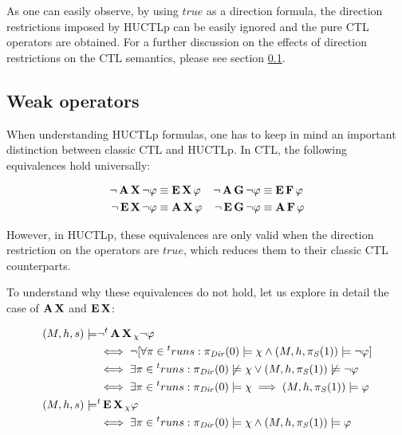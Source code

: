 As one can easily observe, by using $true$ as a direction formula, the direction restrictions imposed by \ac{HUCTLp} can be easily ignored and the pure \ac{CTL} operators are obtained. For a further discussion on the effects of direction restrictions on the \ac{CTL} semantics, please see section \ref{sec:weak}.

\subsection{Weak operators}
\label{sec:weak}

When understanding \ac{HUCTLp} formulas, one has to keep in mind an important distinction between classic \ac{CTL} and \ac{HUCTLp}. In \ac{CTL}, the following equivalences hold universally:

\begin{align*}
	\neg \operatorname{\mathbf{A}}\operatorname{\mathbf{X}} \neg \varphi 			& \equiv \operatorname{\mathbf{E}}\operatorname{\mathbf{X}} \varphi &
	\neg \operatorname{\mathbf{A}}\operatorname{\mathbf{G}} \neg \varphi 			& \equiv \operatorname{\mathbf{E}}\operatorname{\mathbf{F}} \varphi \\
	\neg \operatorname{\mathbf{E}}\operatorname{\mathbf{X}} \neg \varphi 			& \equiv \operatorname{\mathbf{A}}\operatorname{\mathbf{X}} \varphi &
	\neg \operatorname{\mathbf{E}}\operatorname{\mathbf{G}} \neg \varphi 			& \equiv \operatorname{\mathbf{A}}\operatorname{\mathbf{F}} \varphi \\
\end{align*}

However, in \ac{HUCTLp}, these equivalences are only valid when the direction restriction on the operators are $true$, which reduces them to their classic \ac{CTL} counterparts.

To understand why these equivalences do not hold, let us explore in detail the case of $\operatorname{\mathbf{A}}\operatorname{\mathbf{X}}$ and $\operatorname{\mathbf{E}}\operatorname{\mathbf{X}}$:

\begin{align*}
		(M, h, s) \models & \neg {}^{t}\operatorname{\mathbf{A}}\operatorname{\mathbf{X}}{}_{\chi} \neg \varphi	\\	
			& \iff  \neg [ \forall \pi \in {}^{t}runs  : \pi_{\mathit{Dir}}(0) \models \chi \land (M, h, \pi_{\mathit{S}}(1)) \models \neg \varphi ] \\
			& \iff  \exists \pi \in {}^{t}runs  : \pi_{\mathit{Dir}}(0) \not\models \chi \lor (M, h, \pi_{\mathit{S}}(1)) \not\models \neg \varphi \\ 
			& \iff  \exists \pi \in {}^{t}runs  : \pi_{\mathit{Dir}}(0) \models \chi \implies (M, h, \pi_{\mathit{S}}(1)) \models \varphi \\
		(M, h, s) \models & {}^{t}\operatorname{\mathbf{E}}\operatorname{\mathbf{X}}{}_{\chi} \varphi \\		
			& \iff \exists \pi \in {}^{t}runs  : \pi_{\mathit{Dir}}(0) \models \chi \land (M, h, \pi_{\mathit{S}}(1)) \models \varphi \\
\end{align*}

